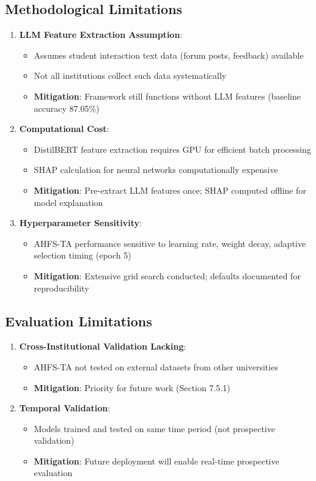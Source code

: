 \subsection{Methodological Limitations}

\begin{enumerate}
\item \textbf{LLM Feature Extraction Assumption}:
\begin{itemize}
\item Assumes student interaction text data (forum posts, feedback) available
\item Not all institutions collect such data systematically
\item \textbf{Mitigation}: Framework still functions without LLM features (baseline accuracy 87.05\%)
\end{itemize}

\item \textbf{Computational Cost}:
\begin{itemize}
\item DistilBERT feature extraction requires GPU for efficient batch processing
\item SHAP calculation for neural networks computationally expensive
\item \textbf{Mitigation}: Pre-extract LLM features once; SHAP computed offline for model explanation
\end{itemize}

\item \textbf{Hyperparameter Sensitivity}:
\begin{itemize}
\item AHFS-TA performance sensitive to learning rate, weight decay, adaptive selection timing (epoch 5)
\item \textbf{Mitigation}: Extensive grid search conducted; defaults documented for reproducibility
\end{itemize}
\end{enumerate}

\subsection{Evaluation Limitations}

\begin{enumerate}
\item \textbf{Cross-Institutional Validation Lacking}:
\begin{itemize}
\item AHFS-TA not tested on external datasets from other universities
\item \textbf{Mitigation}: Priority for future work (Section 7.5.1)
\end{itemize}

\item \textbf{Temporal Validation}:
\begin{itemize}
\item Models trained and tested on same time period (not prospective validation)
\item \textbf{Mitigation}: Future deployment will enable real-time prospective evaluation
\end{itemize}
\end{enumerate}


